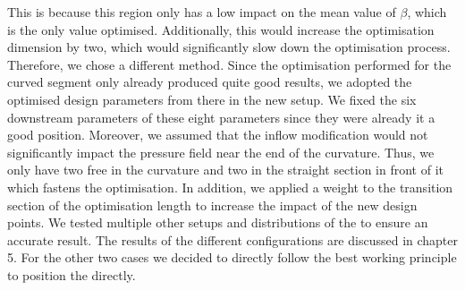 This is because this region only has a low impact on the mean value of $\beta$, which is the only value optimised.
Additionally, this would increase the optimisation dimension by two, which would significantly slow down the optimisation process.
Therefore, we chose a different method. 
Since the optimisation performed for the curved segment only already produced quite good results, we adopted the optimised design parameters from there in the new setup. 
We fixed the six downstream parameters of these eight parameters since they were already it a good position.
Moreover, we assumed that the inflow modification  would not significantly impact the pressure field near the end of the curvature.
Thus, we only have two free  in the curvature and two in the straight section in front of it which fastens the optimisation.
In addition, we applied a weight to the transition section of the optimisation length to increase the impact of the new design points.
We tested multiple other setups and distributions of the  to ensure an accurate result.
The results of the different configurations are discussed in chapter 5.
For the other two cases we decided to directly follow the best working principle to position the  directly.

